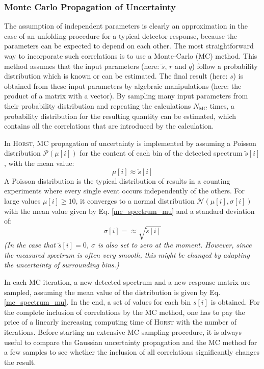\documentclass{article}
\begin{document}
\subsubsection{Monte Carlo Propagation of Uncertainty}

The assumption of independent parameters is clearly an approximation in the case of an unfolding procedure for a typical detector response, because the parameters can be expected to depend on each other.
The most straightforward way to incorporate such correlations is to use a Monte-Carlo (MC) method.
This method assumes that the input parameters (here: $\tilde{s}$, $r$ and $q$) follow a probability distribution which is known or can be estimated.
The final result (here: $s$) is obtained from these input parameters by algebraic manipulations (here: the product of a matrix with a vector).
By sampling many input parameters from their probability distribution and repeating the calculations $N_\mathrm{MC}$ times, a probability distribution for the resulting quantity can be estimated, which contains all the correlations that are introduced by the calculation.

\noindent In \textsc{Horst}, MC propagation of uncertainty is implemented by assuming a Poisson distribution $\mathcal{P}(\mu[i])$ for the content of each bin of the detected spectrum $\tilde{s}[i]$, with the mean value:
%
\begin{equation}
	\label{mc_spectrum_mu}
	\mu [i] \approx \tilde{s}[i]
\end{equation}
%
A Poisson distribution is the typical distribution of results in a counting experiments where every single event occurs independently of the others.
For large values $\mu[i] \geq 10$, it converges to a normal distribution $\mathcal{N}(\mu[i], \sigma[i])$ with the mean value given by Eq. \ref{mc_spectrum_mu} and a standard deviation of:
%
\begin{equation}
	\label{mc_spectrum_sigma}
	\sigma[i] = \approx \sqrt{\tilde{s}[i]}
\end{equation}
%
\textit{(In the case that $\tilde {s} [i] = 0$, $\sigma$ is also set to zero at the moment. However, since the measured spectrum is often very smooth, this might be changed by adapting the uncertainty of surrounding bins.)}

\noindent In each MC iteration, a new detected spectrum and a new response matrix are sampled, assuming the mean value of the distribution is given by Eq. \ref{mc_spectrum_mu}.
In the end, a set of values for each bin $s[i]$ is obtained.
For the complete inclusion of correlations by the MC method, one has to pay the price of a linearly increasing computing time of \textsc{Horst} with the number of iterations.
Before starting an extensive MC sampling procedure, it is always useful to compare the Gaussian uncertainty propagation and the MC method for a few samples to see whether the inclusion of all correlations significantly changes the result.
\end{document}
